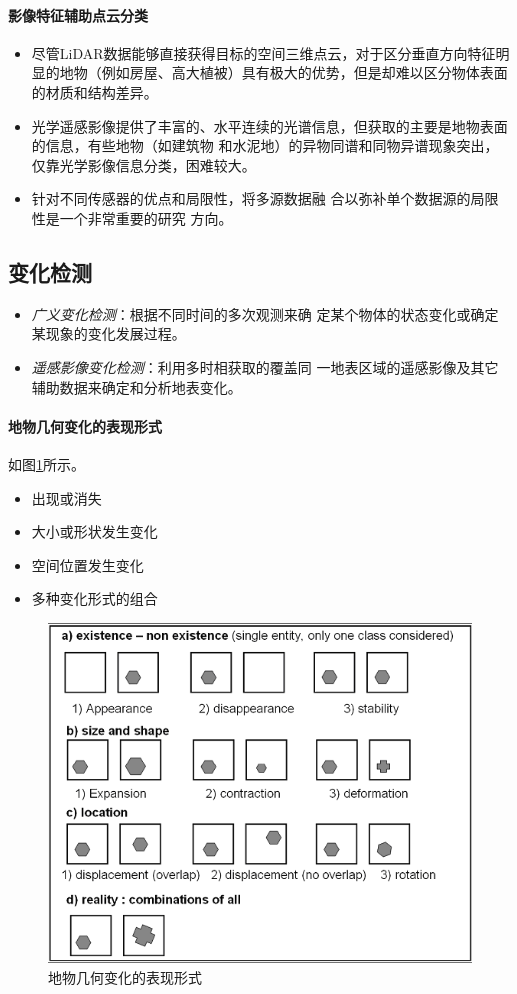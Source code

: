 \paragraph{影像特征辅助点云分类}
\begin{itemize}
	\item 尽管LiDAR数据能够直接获得目标的空间三维点云，对于区分垂直方向特征明显的地物（例如房屋、高大植被）具有极大的优势，但是却难以区分物体表面的材质和结构差异。
	\item 光学遥感影像提供了丰富的、水平连续的光谱信息，但获取的主要是地物表面的信息，有些地物（如建筑物
	和水泥地）的异物同谱和同物异谱现象突出，仅靠光学影像信息分类，困难较大。
	\item 针对不同传感器的优点和局限性，将多源数据融
	合以弥补单个数据源的局限性是一个非常重要的研究
	方向。
\end{itemize}

\subsection{变化检测}

\begin{itemize}
	\item \textit{广义变化检测}：根据不同时间的多次观测来确
		定某个物体的状态变化或确定某现象的变化发展过程。
	\item \textit{遥感影像变化检测}：利用多时相获取的覆盖同
		一地表区域的遥感影像及其它辅助数据来确定和分析地表变化。
\end{itemize}

\paragraph{地物几何变化的表现形式}如图\ref{fig:地物几何变化的表现形式}所示。
\begin{itemize}
	\item 出现或消失
	\item 大小或形状发生变化
	\item 空间位置发生变化
	\item 多种变化形式的组合
\end{itemize}

\begin{figure}
	\centering
	\includegraphics[width=0.5\linewidth]{figure/Chapter6/地物几何变化的表现形式}
	\caption{地物几何变化的表现形式}
	\label{fig:地物几何变化的表现形式}
\end{figure}

